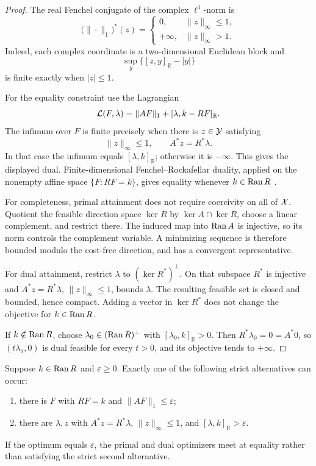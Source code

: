 \begin{proof}
The real Fenchel conjugate of the complex \(\ell^1\)-norm is
\[
 \bigl(\|\cdot\|_1\bigr)^*(z)
 =
 \begin{cases}
  0,&\|z\|_\infty\le1,\\
  +\infty,&\|z\|_\infty>1.
 \end{cases}
\]
Indeed, each complex coordinate is a two-dimensional Euclidean block and
\[
 \sup_y\{[z,y]_{\mathbb R}-|y|\}
 \]
is finite exactly when \(|z|\le1\).

For the equality constraint use the Lagrangian
\[
 \mathcal L(F,\lambda)
 =
 \|AF\|_1+[\lambda,k-RF]_{\mathbb R}.
\]
The infimum over \(F\) is finite precisely when there is
\(z\in\mathcal Y\) satisfying
\[
 \|z\|_\infty\le1,
 \qquad
 A^*z=R^*\lambda.
\]
In that case the infimum equals \([\lambda,k]_{\mathbb R}\); otherwise it
is \(-\infty\).  This gives the displayed dual.  Finite-dimensional
Fenchel--Rockafellar duality, applied on the nonempty affine space
\(\{F:RF=k\}\), gives equality whenever \(k\in\operatorname{Ran} R\)
\citep{Rockafellar1970}.

For completeness, primal attainment does not require coercivity on all
of \(\mathcal X\).  Quotient the feasible direction space \(\ker R\) by
\(\ker A\cap\ker R\), choose a linear complement, and restrict there.
The induced map into \(\operatorname{Ran} A\) is injective, so its norm controls the
complement variable.  A minimizing sequence is therefore bounded modulo
the cost-free direction, and has a convergent representative.

For dual attainment, restrict \(\lambda\) to
\((\ker R^*)^\perp\).  On that subspace \(R^*\) is injective and
\(A^*z=R^*\lambda\), \(\|z\|_\infty\le1\), bounds \(\lambda\).
The resulting feasible set is closed and bounded, hence compact.
Adding a vector in \(\ker R^*\) does not change the objective for
\(k\in\operatorname{Ran} R\).

If \(k\notin\operatorname{Ran} R\), choose
\(\lambda_0\in(\operatorname{Ran} R)^\perp\) with
\([\lambda_0,k]_{\mathbb R}>0\).  Then
\(R^*\lambda_0=0=A^*0\), so
\((t\lambda_0,0)\) is dual feasible for every \(t>0\), and its objective
tends to \(+\infty\).
\end{proof}

\begin{corollary}
\label{cor:certificate-obstruction}
Suppose \(k\in\operatorname{Ran} R\) and \(\varepsilon\ge0\).  Exactly one of the
following strict alternatives can occur:
\begin{enumerate}[label=\textup{(\alph*)},leftmargin=2.6em]
 \item there is \(F\) with \(RF=k\) and \(\|AF\|_1\le\varepsilon\);
 \item there are \(\lambda,z\) with
       \(A^*z=R^*\lambda\), \(\|z\|_\infty\le1\), and
       \([\lambda,k]_{\mathbb R}>\varepsilon\).
\end{enumerate}
If the optimum equals \(\varepsilon\), the primal and dual optimizers
meet at equality rather than satisfying the strict second alternative.
\end{corollary}

